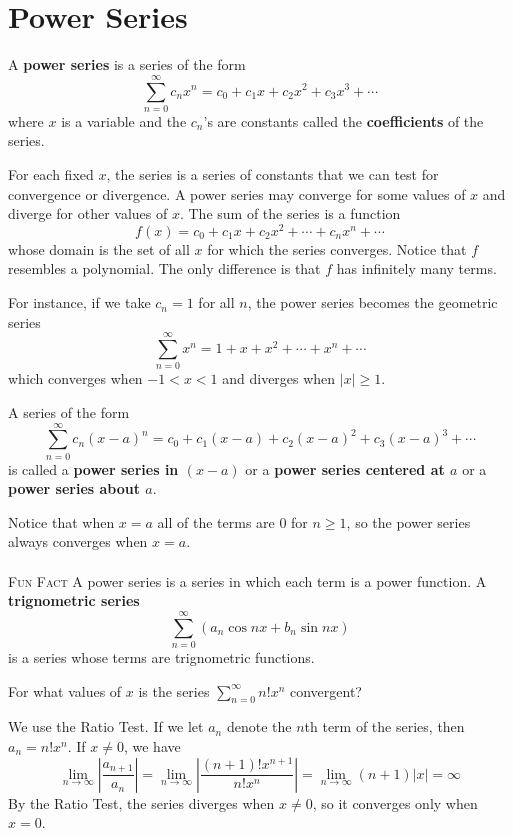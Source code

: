 \section{Power Series}
  \begin{definition}
    A \textbf{power series} is a series of the form
    $$\sum_{n=0}^{\infty} c_n x^n = c_0 + c_1 x + c_2 x^2 + c_3 x^3 + \cdots $$
    where $x$ is a variable and the $c_n$'s are constants called the \textbf{coefficients} of the series.
  \end{definition}
  For each fixed $x$, the series is a series of constants that we can test for convergence or divergence. A power series may converge for some values of $x$ and diverge for other values of $x$. The sum of the series is a function
  $$ f(x) = c_0 + c_1 x + c_2 x^2 + \cdots + c_n x^n + \cdots $$
  whose domain is the set of all $x$ for which the series converges. Notice that $f$ resembles a polynomial. The only difference is that $f$ has infinitely many terms.\par
  For instance, if we take $c_n = 1$ for all $n$, the power series becomes the geometric series
  $$ \sum_{n=0}^{\infty} x^n = 1 + x + x^2 + \cdots + x^n + \cdots $$
  which converges when $-1<x<1$ and diverges when $|x|\geq 1$.
  \begin{definition}
    A series of the form
    $$\sum_{n=0}^{\infty} c_n (x-a)^n = c_0 + c_1 (x-a) + c_2 (x-a)^2 + c_3 (x-a)^3 + \cdots $$
    is called a \textbf{power series in $(x-a)$} or a \textbf{power series centered at $a$} or a \textbf{power series about $a$}.
  \end{definition}
  Notice that when $x=a$ all of the terms are 0 for $n \geq 1$, so the power series always converges when $x=a$.\\~\\
  \textsc{Fun Fact} A power series is a series in which each term is a power function. A \textbf{trignometric series}
  $$\sum_{n=0}^{\infty} (a_n \cos nx + b_n \sin nx)$$
  is a series whose terms are trignometric functions.
  \begin{example}
    For what values of $x$ is the series $\displaystyle \sum_{n=0}^{\infty} n!x^n$ convergent?
  \end{example}
  \begin{solution}
    We use the Ratio Test. If we let $a_n$ denote the $n$th term of the series, then $a_n= n!x^n$. If $x \neq 0$, we have
    $$ \lim_{n\to\infty} \left|\frac{a_{n+1}}{a_n}\right| = \lim_{n\to\infty} \left|\frac{(n+1)!x^{n+1}}{n!x^n}\right| = \lim_{n\to\infty} (n+1)|x| = \infty $$
    By the Ratio Test, the series diverges when $x \neq 0$, so it converges only when $x = 0$.
  \end{solution}
